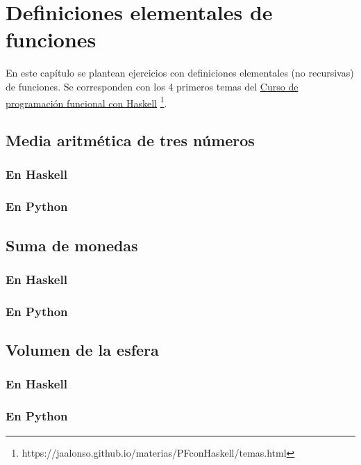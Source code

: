 \documentclass[a4paper,12pt,twoside]{book}
\begin{document}
\chapter{Definiciones elementales de funciones}

En este capítulo se plantean ejercicios con definiciones elementales (no
recursivas) de funciones. Se corresponden con los 4 primeros temas del
\href{https://jaalonso.github.io/materias/PFconHaskell/temas.html}
{Curso de programación funcional con Haskell}
\footnote{https://jaalonso.github.io/materias/PFconHaskell/temas.html}.

\minitoc

\section{Media aritmética de tres números}
\subsection*{En Haskell}
\subsection*{En Python}

\section{Suma de monedas}
\subsection*{En Haskell}
\subsection*{En Python}

\section{Volumen de la esfera}
\subsection*{En Haskell}
\subsection*{En Python}
\end{document}

